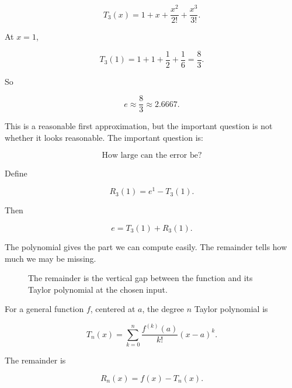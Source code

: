 \[
T_3(x)=1+x+\frac{x^2}{2!}+\frac{x^3}{3!}.
\]

At \(x=1\),

\[
T_3(1)=1+1+\frac12+\frac16=\frac83.
\]

So

\[
e\approx \frac83\approx2.6667.
\]

This is a reasonable first approximation, but the important question is not whether it
looks reasonable.  The important question is:

\[
\text{How large can the error be?}
\]

Define

\[
R_3(1)=e^1-T_3(1).
\]

Then

\[
e=T_3(1)+R_3(1).
\]

The polynomial gives the part we can compute easily.  The remainder tells how much
we may be missing.

\begin{figure}[h]
\centering
{}
\caption{The remainder is the vertical gap between the function and its Taylor polynomial at the chosen input.}
\label{fig:taylor-remainder-gap}
\end{figure}

For a general function \(f\), centered at \(a\), the degree \(n\) Taylor polynomial is

\[
T_n(x)=
\sum_{k=0}^{n}
\frac{f^{(k)}(a)}{k!}(x-a)^k.
\]

The remainder is

\[
\boxed{
R_n(x)=f(x)-T_n(x).
}
\]

